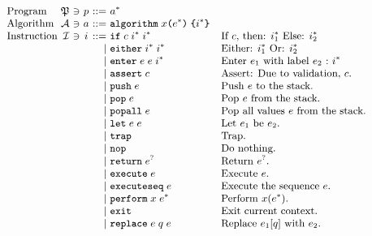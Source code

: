 \begin{figure}[t]
\[
\small
\begin{array}{l@{~}r@{~}c@{~}c@{~}r@{~}lll}
\text{Program} & \progset &\ni& \prog &::=& \alg^*\\
\text{Algorithm} & \algset &\ni& \alg &::=&
\kwalg \; \varx \kwrl \expr^* \kwrr \; \kwcl \inst^* \kwcr \\
\text{Instruction} & \instset &\ni& \inst &::=&
    \kwif \; \cond \; \inst^* \; \inst^* & \mbox{If $\cond$, then: $\inst_1^*$ Else: $\inst_2^*$}\\
&&&& \mid&
    \kweither \; \inst^* \; \inst^* & \mbox{Either: $\inst_1^*$ Or: $\inst_2^*$}\\
&&&& \mid&
    \kwenter \; \expr \; \expr \; \inst^* & \mbox{Enter $\expr_1$ with label $\expr_2$\ :\ $\inst^*$}\\
&&&& \mid&
    \kwassert \; \cond  & \mbox{Assert: Due to validation, $\cond$.}\\
&&&& \mid&
    \kwpush \; \expr  & \mbox{Push $\expr$ to the stack.}\\
&&&& \mid&
    \kwpop \; \expr  & \mbox{Pop $\expr$ from the stack.}\\
&&&& \mid&
    \kwpopall \; \expr  & \mbox{Pop all values $\expr$ from the stack.}\\
&&&& \mid&
    \kwlet \; \expr \; \expr & \mbox{Let $\expr_1$ be $\expr_2$.}\\
&&&& \mid&
    \kwtrap & \mbox{Trap.}\\
&&&& \mid&
    \kwnop & \mbox{Do nothing.}\\
&&&& \mid&
    \kwreturn \; \expr^? & \mbox{Return $\expr^?$.}\\
&&&& \mid&
    \kwexecute \; \expr & \mbox{Execute $\expr$.}\\
&&&& \mid&
    \kwexecuteseq \; \expr & \mbox{Execute the sequence $\expr$.}\\
&&&& \mid&
    \kwperform \; \varx \; \expr^* & \mbox{Perform $\varx(\expr^*)$.}\\
&&&& \mid&
    \kwexit & \mbox{Exit current context.}\\
&&&& \mid&
    \kwreplace \; \expr \; \qual \; \expr & \mbox{Replace $\expr_1[\qual]$ with $\expr_2$.}
\\


\end{array}\]
\end{figure}
